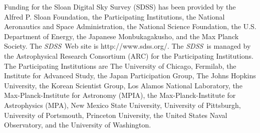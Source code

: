 \documentclass[12pt,preprint]{aastex}
\newcommand{\project}[1]{\textsl{#1}}
\newcommand{\sdss}{\project{SDSS}}
\newcommand{\SDSS}{\sdss}
\begin{document}
Funding for the Sloan Digital Sky Survey (SDSS) has been provided by
the Alfred P. Sloan Foundation, the Participating Institutions, the
National Aeronautics and Space Administration, the National Science
Foundation, the U.S. Department of Energy, the Japanese
Monbukagakusho, and the Max Planck Society. The \SDSS\ Web site is
http://www.sdss.org/. The \SDSS\ is managed by the Astrophysical
Research Consortium (ARC) for the Participating Institutions. The
Participating Institutions are The University of Chicago, Fermilab,
the Institute for Advanced Study, the Japan Participation Group, The
Johns Hopkins University, the Korean Scientist Group, Los Alamos
National Laboratory, the Max-Planck-Institute for Astronomy (MPIA),
the Max-Planck-Institute for Astrophysics (MPA), New Mexico State
University, University of Pittsburgh, University of Portsmouth,
Princeton University, the United States Naval Observatory, and the
University of Washington.
\end{document}
